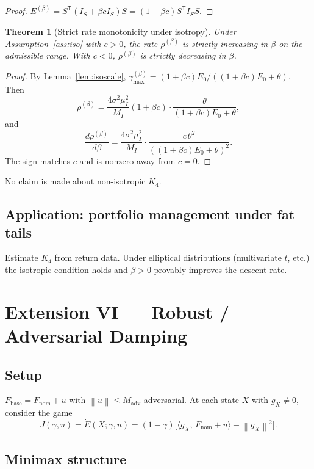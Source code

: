 \documentclass[11pt,a4paper]{article}
\newtheorem{theorem}{Theorem}[section]
\theoremstyle{definition}
\newcommand{\Fbase}{F_{\mathrm{base}}}
\newcommand{\T}{^{\mathsf{T}}}
\newcommand{\norm}[1]{\left\|#1\right\|}
\newcommand{\inner}[2]{\langle #1,\,#2\rangle}
\newcommand{\nom}{\mathrm{nom}}
\newcommand{\adv}{\mathrm{adv}}
\begin{document}
\begin{proof}
$E^{(\beta)} = S\T(I_S + \beta c I_S) S = (1 + \beta c) S\T I_S S$.
\end{proof}

\begin{theorem}[Strict rate monotonicity under isotropy]
\label{thm:ac3}
Under Assumption~\ref{ass:iso} with $c > 0$, the rate $\rho^{(\beta)}$ is strictly increasing in $\beta$ on the admissible range. With $c < 0$, $\rho^{(\beta)}$ is strictly decreasing in $\beta$.
\end{theorem}

\begin{proof}
By Lemma~\ref{lem:isoscale}, $\gamma_{\max}^{(\beta)} = (1+\beta c) E_0 / ((1+\beta c) E_0 + \theta)$. Then
\[
\rho^{(\beta)} = \frac{4\sigma^2 \mu_I^2}{M_I} (1 + \beta c) \cdot \frac{\theta}{(1+\beta c) E_0 + \theta},
\]
and
\[
\frac{d \rho^{(\beta)}}{d\beta}
= \frac{4\sigma^2 \mu_I^2}{M_I} \cdot \frac{c\,\theta^2}{((1+\beta c)E_0 + \theta)^2}.
\]
The sign matches $c$ and is nonzero away from $c = 0$.
\end{proof}

No claim is made about non-isotropic $K_4$.

\subsection{Application: portfolio management under fat tails}

Estimate $K_4$ from return data. Under elliptical distributions (multivariate $t$, etc.) the isotropic condition holds and $\beta > 0$ provably improves the descent rate.

\newpage

\section{Extension VI --- Robust / Adversarial Damping}

\subsection{Setup}

$\Fbase = F_\nom + u$ with $\norm{u} \leq M_\adv$ adversarial. At each state $X$ with $g_X \neq 0$, consider the game
\[
J(\gamma, u) = \dot E(X; \gamma, u) = (1-\gamma)\big[\inner{g_X}{F_\nom + u} - \norm{g_X}^2\big].
\]

\subsection{Minimax structure}
\end{document}
